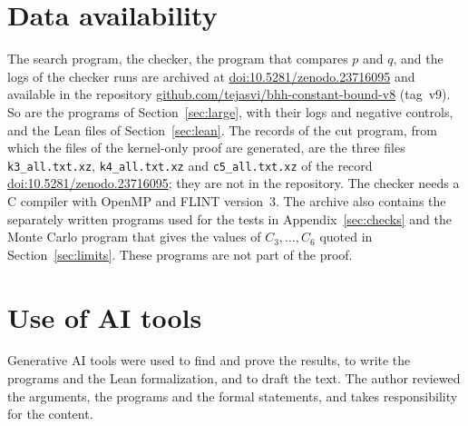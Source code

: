 \documentclass[11pt]{amsart}
\theoremstyle{definition}
\theoremstyle{remark}
\numberwithin{equation}{section}
\newcommand{\ZENODODOI}{10.5281/zenodo.23716095}%
\newcommand{\REPOURL}{https://github.com/tejasvi/bhh-constant-bound-v8/tree/v9}
\begin{document}
\FloatBarrier
\section*{Data availability}
The search program, the checker, the program that compares $p$ and $q$, and the logs of the checker runs are archived at \href{https://doi.org/\ZENODODOI}{doi:\ZENODODOI} and available in the repository \href{\REPOURL}{github.com/tejasvi/bhh-constant-bound-v8} (tag~v9). So are the programs of Section~\ref{sec:large}, with their logs and negative controls, and the Lean files of Section~\ref{sec:lean}. The records of the cut program, from which the files of the kernel-only proof are generated, are the three files \texttt{k3\_all.txt.xz}, \texttt{k4\_all.txt.xz} and \texttt{c5\_all.txt.xz} of the record \href{https://doi.org/\ZENODODOI}{doi:\ZENODODOI}; they are not in the repository. The checker needs a C compiler with OpenMP and FLINT version~3. The archive also contains the separately written programs used for the tests in Appendix~\ref{sec:checks} and the Monte Carlo program that gives the values of $C_3,\dots,C_6$ quoted in Section~\ref{sec:limits}. These programs are not part of the proof.

\section*{Use of AI tools}
Generative AI tools were used to find and prove the results, to write the programs and the Lean formalization, and to draft the text. The author reviewed the arguments, the programs and the formal statements, and takes responsibility for the content.
\end{document}
